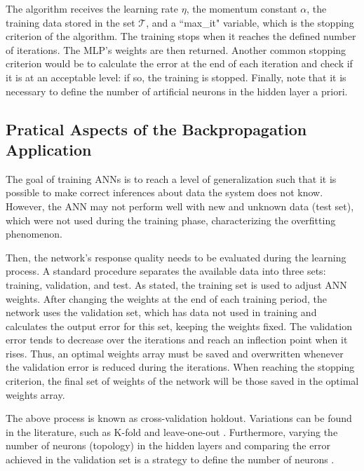 
The algorithm receives the learning rate $\eta$, the momentum constant $\alpha$, the training data stored in the set $\mathcal{T}$, and a ``max\_it" variable, which is the stopping criterion of the algorithm. The training stops when it reaches the defined number of iterations. The MLP's weights are then returned. Another common stopping criterion would be to calculate the error at the end of each iteration and check if it is at an acceptable level: if so, the training is stopped. Finally, note that it is necessary to define the number of artificial neurons in the hidden layer a priori.

\subsection{Pratical Aspects of the Backpropagation Application}
\label{ssec:Pratical}

The goal of training ANNs is to reach a level of generalization such that it is possible to make correct inferences about data the system does not know. However, the ANN may not perform well with new and unknown data (test set), which were not used during the training phase, characterizing the overfitting phenomenon.

Then, the network's response quality needs to be evaluated during the learning process. A standard procedure separates the available data into three sets: training, validation, and test. As stated, the training set is used to adjust ANN weights. After changing the weights at the end of each training period, the network uses the validation set, which has data not used in training and calculates the output error for this set, keeping the weights fixed. The validation error tends to decrease over the iterations and reach an inflection point when it rises. Thus, an optimal weights array must be saved and overwritten whenever the validation error is reduced during the iterations. When reaching the stopping criterion, the final set of weights of the network will be those saved in the optimal weights array.

The above process is known as cross-validation holdout. Variations can be found in the literature, such as K-fold and leave-one-out \cite{haykin, Castro2006FundamentalsON}. Furthermore, varying the number of neurons (topology) in the hidden layers and comparing the error achieved in the validation set is a strategy to define the number of neurons \cite{James2013}.

